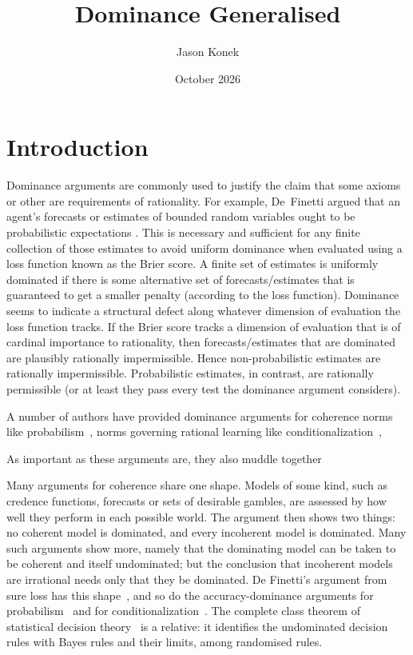 \documentclass[11pt]{article}
\title{Dominance Generalised}
\author{Jason Konek}
\date{October 2026}
\theoremstyle{definition}
\begin{document}
\maketitle

\begin{abstract}
\end{abstract}


\section{Introduction}


Dominance arguments are commonly used to justify the claim that some axioms or other are requirements of rationality. For example, De~Finetti argued that an agent's forecasts or estimates of bounded random variables ought to be probabilistic expectations \cite[\S1.6, \S3.3]{deFinetti1974}. This is necessary and sufficient for any finite collection of those estimates to avoid uniform dominance when evaluated using a loss function known as the Brier score. A finite set of estimates is uniformly dominated if there is some alternative set of forecasts/estimates that is guaranteed to get a smaller penalty (according to the loss function). Dominance seems to indicate a structural defect along whatever dimension of evaluation the loss function tracks. If the Brier score tracks a dimension of evaluation that is of cardinal importance to rationality, then forecasts/estimates that are dominated are plausibly rationally impermissible. Hence non-probabilistic estimates are rationally impermissible. Probabilistic estimates, in contrast, are rationally permissible (or at least they pass every test the dominance argument considers).


A number of authors have provided dominance arguments for coherence norms like probabilism~\cite{Joyce2009,Predd2009,SSK2009,Pettigrew2022,Nielsen2023}, norms governing rational learning like conditionalization~\cite{Briggs2020,Nielsen2021},

As important as these arguments are, they also muddle together




\newpage


Many arguments for coherence share one shape. Models of some kind, such as credence functions, forecasts or sets of desirable gambles, are assessed by how well they perform in each possible world. The argument then shows two things: no coherent model is dominated, and every incoherent model is dominated. Many such arguments show more, namely that the dominating model can be taken to be coherent and itself undominated; but the conclusion that incoherent models are irrational needs only that they be dominated. De Finetti's argument from sure loss has this shape~\cite{deFinetti1974}, and so do the accuracy-dominance arguments for probabilism~\cite{Joyce2009,Predd2009,SSK2009,Pettigrew2022,Nielsen2023} and for conditionalization~\cite{Briggs2020,Nielsen2021}. The complete class theorem of statistical decision theory~\cite{Wald1950} is a relative: it identifies the undominated decision rules with Bayes rules and their limits, among randomised rules.
\end{document}
